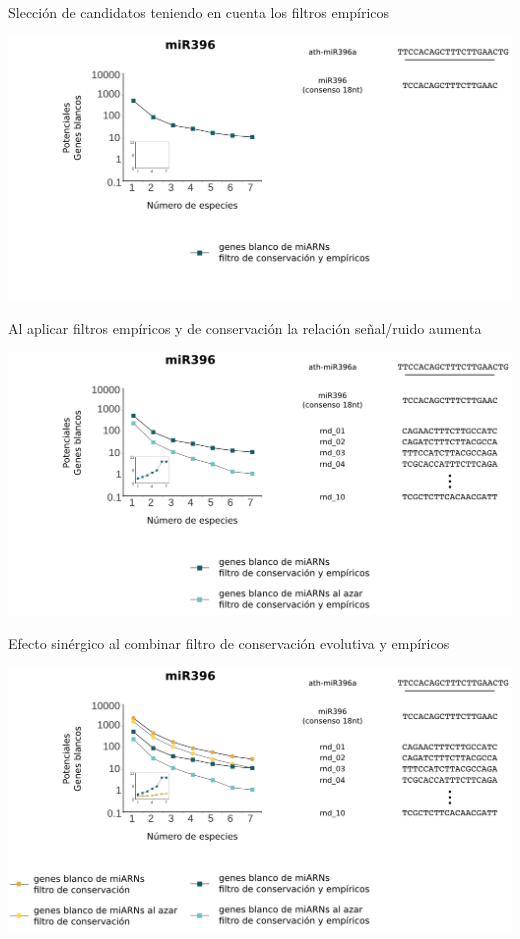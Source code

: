 \documentclass{beamer}
\begin{document}
\begin{frame}{Slección de candidatos teniendo en cuenta los filtros empíricos}
	\begin{center}
		\includegraphics[width=1\textwidth]{img/NAR_fig2_03.png}
	\end{center}
\end{frame}

\begin{frame}{Al aplicar filtros empíricos y de conservación la relación señal/ruido aumenta}
	\begin{center}
		\includegraphics[width=1\textwidth]{img/NAR_fig2_04.png}
	\end{center}
\end{frame}

\begin{frame}{Efecto sinérgico al combinar filtro de conservación evolutiva y empíricos}
	\begin{center}
		\includegraphics[width=1\textwidth]{img/NAR_fig2_05.png}
	\end{center}
\end{frame}
\end{document}
